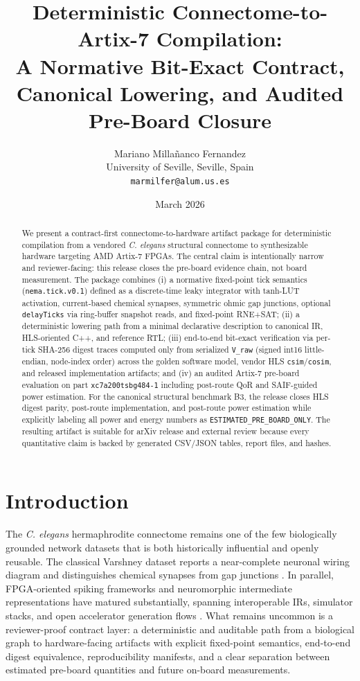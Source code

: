 \documentclass[11pt]{article}
\title{Deterministic Connectome-to-Artix-7 Compilation:\\A Normative Bit-Exact Contract, Canonical Lowering, and Audited Pre-Board Closure}
\author{Mariano Milla\~nanco Fernandez\\University of Seville, Seville, Spain\\\texttt{marmilfer@alum.us.es}}
\date{March 2026}
\begin{document}
\maketitle

\begin{abstract}
We present a contract-first connectome-to-hardware artifact package for deterministic compilation from a vendored \emph{C. elegans} structural connectome to synthesizable hardware targeting AMD Artix-7 FPGAs. The central claim is intentionally narrow and reviewer-facing: this release closes the pre-board evidence chain, not board measurement. The package combines (i) a normative fixed-point tick semantics (\texttt{nema.tick.v0.1}) defined as a discrete-time leaky integrator with tanh-LUT activation, current-based chemical synapses, symmetric ohmic gap junctions, optional \texttt{delayTicks} via ring-buffer snapshot reads, and fixed-point RNE+SAT; (ii) a deterministic lowering path from a minimal declarative description to canonical IR, HLS-oriented C++, and reference RTL; (iii) end-to-end bit-exact verification via per-tick SHA-256 digest traces computed only from serialized \texttt{V\_raw} (signed int16 little-endian, node-index order) across the golden software model, vendor HLS \texttt{csim}/\texttt{cosim}, and released implementation artifacts; and (iv) an audited Artix-7 pre-board evaluation on part \texttt{xc7a200tsbg484-1} including post-route QoR and SAIF-guided power estimation. For the canonical structural benchmark B3, the release closes HLS digest parity, post-route implementation, and post-route power estimation while explicitly labeling all power and energy numbers as \texttt{ESTIMATED\_PRE\_BOARD\_ONLY}. The resulting artifact is suitable for arXiv release and external review because every quantitative claim is backed by generated CSV/JSON tables, report files, and hashes.
\end{abstract}

\section{Introduction}
The \emph{C. elegans} hermaphrodite connectome remains one of the few biologically grounded network datasets that is both historically influential and openly reusable. The classical Varshney dataset reports a near-complete neuronal wiring diagram and distinguishes chemical synapses from gap junctions \cite{varshney2011,openworm_varshney}. In parallel, FPGA-oriented spiking frameworks and neuromorphic intermediate representations have matured substantially, spanning interoperable IRs, simulator stacks, and open accelerator generation flows \cite{pedersen2024nir,lava,finn,hls4ml2021,spikerplus2024,neurocorex2025}. What remains uncommon is a reviewer-proof contract layer: a deterministic and auditable path from a biological graph to hardware-facing artifacts with explicit fixed-point semantics, end-to-end digest equivalence, reproducibility manifests, and a clear separation between estimated pre-board quantities and future on-board measurements.
\end{document}
